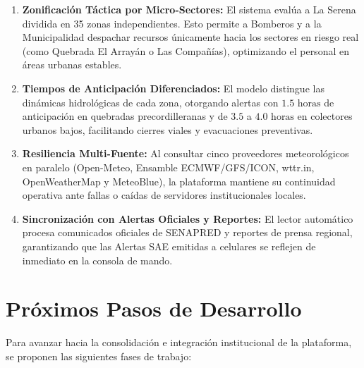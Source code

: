 \documentclass[11pt,a4paper]{article}
\begin{document}
\begin{enumerate}
    \item \textbf{Zonificación Táctica por Micro-Sectores:} El sistema evalúa a La Serena dividida en 35 zonas independientes. Esto permite a Bomberos y a la Municipalidad despachar recursos únicamente hacia los sectores en riesgo real (como Quebrada El Arrayán o Las Compañías), optimizando el personal en áreas urbanas estables.
    
    \item \textbf{Tiempos de Anticipación Diferenciados:} El modelo distingue las dinámicas hidrológicas de cada zona, otorgando alertas con $1.5\text{ horas}$ de anticipación en quebradas precordilleranas y de $3.5$ a $4.0\text{ horas}$ en colectores urbanos bajos, facilitando cierres viales y evacuaciones preventivas.
    
    \item \textbf{Resiliencia Multi-Fuente:} Al consultar cinco proveedores meteorológicos en paralelo (Open-Meteo, Ensamble ECMWF/GFS/ICON, wttr.in, OpenWeatherMap y MeteoBlue), la plataforma mantiene su continuidad operativa ante fallas o caídas de servidores institucionales locales.
    
    \item \textbf{Sincronización con Alertas Oficiales y Reportes:} El lector automático procesa comunicados oficiales de SENAPRED y reportes de prensa regional, garantizando que las Alertas SAE emitidas a celulares se reflejen de inmediato en la consola de mando.
\end{enumerate}

\section{Próximos Pasos de Desarrollo}

Para avanzar hacia la consolidación e integración institucional de la plataforma, se proponen las siguientes fases de trabajo:
\end{document}
